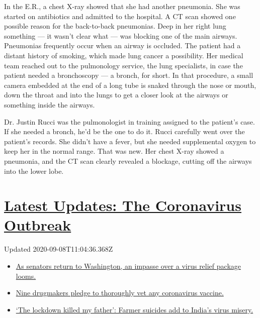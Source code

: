 In the E.R., a chest X-ray showed that she had another pneumonia. She
was started on antibiotics and admitted to the hospital. A CT scan
showed one possible reason for the back-to-back pneumonias. Deep in her
right lung something --- it wasn't clear what --- was blocking one of
the main airways. Pneumonias frequently occur when an airway is
occluded. The patient had a distant history of smoking, which made lung
cancer a possibility. Her medical team reached out to the pulmonology
service, the lung specialists, in case the patient needed a bronchoscopy
--- a bronch, for short. In that procedure, a small camera embedded at
the end of a long tube is snaked through the nose or mouth, down the
throat and into the lungs to get a closer look at the airways or
something inside the airways.

Dr. Justin Rucci was the pulmonologist in training assigned to the
patient's case. If she needed a bronch, he'd be the one to do it. Rucci
carefully went over the patient's records. She didn't have a fever, but
she needed supplemental oxygen to keep her in the normal range. That was
new. Her chest X-ray showed a pneumonia, and the CT scan clearly
revealed a blockage, cutting off the airways into the lower lobe.

\hypertarget{latest-updates-the-coronavirus-outbreak}{%
\section{\texorpdfstring{\href{https://www.nytimes3xbfgragh.onion/2020/09/08/world/covid-19-coronavirus.html?action=click\&pgtype=Article\&state=default\&region=MAIN_CONTENT_1\&context=storylines_live_updates}{Latest
Updates: The Coronavirus
Outbreak}}{Latest Updates: The Coronavirus Outbreak}}\label{latest-updates-the-coronavirus-outbreak}}

Updated 2020-09-08T11:04:36.368Z

\begin{itemize}
\tightlist
\item
  \href{https://www.nytimes3xbfgragh.onion/2020/09/08/world/covid-19-coronavirus.html?action=click\&pgtype=Article\&state=default\&region=MAIN_CONTENT_1\&context=storylines_live_updates\#link-4a77847f}{As
  senators return to Washington, an impasse over a virus relief package
  looms.}
\item
  \href{https://www.nytimes3xbfgragh.onion/2020/09/08/world/covid-19-coronavirus.html?action=click\&pgtype=Article\&state=default\&region=MAIN_CONTENT_1\&context=storylines_live_updates\#link-679303d7}{Nine
  drugmakers pledge to thoroughly vet any coronavirus vaccine.}
\item
  \href{https://www.nytimes3xbfgragh.onion/2020/09/08/world/covid-19-coronavirus.html?action=click\&pgtype=Article\&state=default\&region=MAIN_CONTENT_1\&context=storylines_live_updates\#link-1c973131}{`The
  lockdown killed my father': Farmer suicides add to India's virus
  misery.}
\end{itemize}

